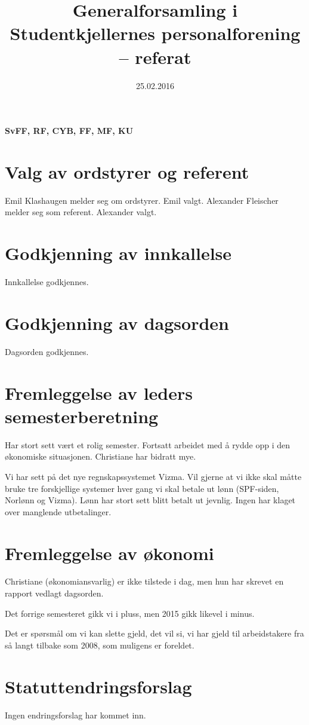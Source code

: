 \documentclass{article}[12pt]
\begin{document}
\title{Generalforsamling i Studentkjellernes personalforening -- referat}
\date{25.02.2016}
\maketitle

\textbf{SvFF, RF, CYB, FF, MF, KU}

\section{Valg av ordstyrer og referent}
Emil Klashaugen melder seg om ordstyrer. Emil valgt. 
Alexander Fleischer melder seg som referent. Alexander valgt.

\section{Godkjenning av innkallelse}
Innkallelse godkjennes.

\section{Godkjenning av dagsorden}
Dagsorden godkjennes.

\section{Fremleggelse av leders semesterberetning}
Har stort sett vært et rolig semester.
Fortsatt arbeidet med å rydde opp i den økonomiske situasjonen.
Christiane har bidratt mye.

Vi har sett på det nye regnskapssystemet Vizma.
Vil gjerne at vi ikke skal måtte bruke tre forskjellige systemer hver gang vi
skal betale ut lønn (SPF-siden, Norlønn og Vizma).
Lønn har stort sett blitt betalt ut jevnlig.
Ingen har klaget over manglende utbetalinger.

\section{Fremleggelse av økonomi}
Christiane (økonomiansvarlig) er ikke tilstede i dag, men hun har skrevet en
rapport vedlagt dagsorden.

Det forrige semesteret gikk vi i pluss, men 2015 gikk likevel i minus.

Det er spørsmål om vi kan slette gjeld, det vil si, vi har gjeld
til arbeidstakere fra så langt tilbake som 2008, som muligens er foreldet.

\section{Statuttendringsforslag}
Ingen endringsforslag har kommet inn.
\end{document}
